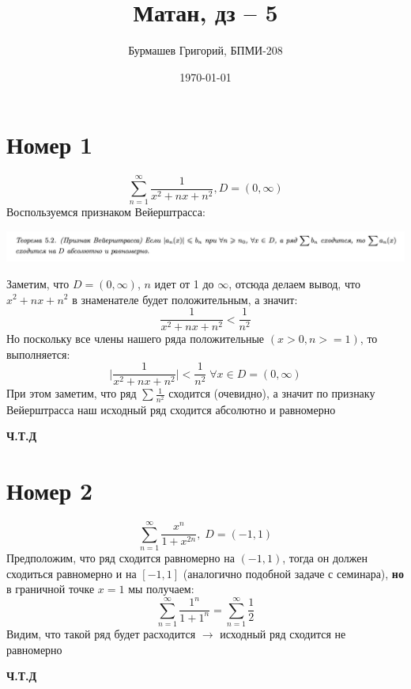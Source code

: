\documentclass[a4paper,12pt]{article}
\author{Бурмашев Григорий, БПМИ-208}
\title{Матан, дз -- 5}
\date{\today}
\begin{document}
\maketitle 
\clearpage
\section*{Номер 1}
\[
\sum_{n = 1}^{\infty} \frac{1}{x^2 + nx + n^2}, D = (0, \infty)
\]
Воспользуемся признаком Вейерштрасса:
\begin{flushleft}
\includegraphics[scale=0.3]{1.png}
\end{flushleft}
Заметим, что $D = (0, \infty)$, $n$ идет от 1 до $\infty$, отсюда делаем вывод, что $x^2 + nx + n^2$ в знаменателе будет положительным, а значит:
\[
\frac{1}{x^2 + nx + n^2} < \frac{1}{n^2}
\]
Но поскольку все члены нашего ряда положительные $(x > 0, n >= 1)$, то выполняется:
\[
\Big| \frac{1}{x^2 + nx + n^2} \Big| < \frac{1}{n^2} \; \forall x \in D = (0, \infty)
\]
При этом заметим, что ряд $\sum \frac{1}{n^2}$ сходится (очевидно), а значит по признаку Вейерштрасса наш исходный ряд сходится абсолютно и равномерно 
\begin{center}
\textbf{Ч.Т.Д} 
\end{center}
\clearpage
\section*{Номер 2}
\[
\sum_{n = 1}^{\infty} \frac{x^n}{1 + x^{2n}}, \; D = (-1, 1)
\]
Предположим, что ряд сходится равномерно на $(-1, 1)$, тогда он должен сходиться равномерно и на $[-1, 1]$ (аналогично подобной задаче с семинара), \textbf{но} в граничной точке $x = 1$ мы получаем:
\[
\sum_{n = 1}^{\infty} \frac{1^n}{1 + 1^n} =\sum_{n = 1}^{\infty} \frac{1}{2}
\]
Видим, что такой ряд будет расходится $\rightarrow$ исходный ряд сходится не равномерно
\begin{center}
\textbf{Ч.Т.Д}  
\end{center}
\end{document}
